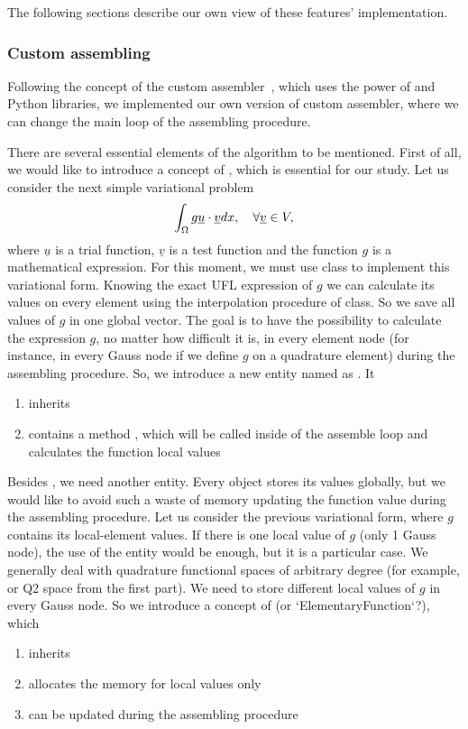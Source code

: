 \documentclass[12pt]{article}
\begin{document}
The following sections describe our own view of these features' implementation.

\subsubsection{Custom assembling}

Following the concept of the custom assembler~\parencite{test_custom_assembler}, which uses the power of  and  Python libraries, we implemented our own version of custom assembler, where we can change the main loop of the assembling procedure.

There are several essential elements of the algorithm to be mentioned. First of all, we would like to introduce a concept of , which is essential for our study. Let us consider the next simple variational problem 
$$ \int_\Omega g \underline{u} \cdot \underline{v} dx, \quad \forall \underline{v} \in V, $$
where $\underline{u}$ is a trial function, $\underline{v}$ is a test function and the function $g$ is a mathematical expression. For this moment, we must use  class to implement this variational form. Knowing the exact UFL expression of $g$ we can calculate its values on every element using the interpolation procedure of  class. So we save all values of $g$ in one global vector. The goal is to have the possibility to calculate the expression $g$, no matter how difficult it is, in every element node (for instance, in every Gauss node if we define $g$ on a quadrature element) during the assembling procedure. So, we introduce a new entity named as . It
\begin{enumerate}
    \item inherits 
    \item contains a method , which will be called inside of the assemble loop and calculates the function local values
\end{enumerate}

Besides , we need another entity. Every  object stores its values globally, but we would like to avoid such a waste of memory updating the function value during the assembling procedure. Let us consider the previous variational form, where $g$ contains its local-element values. If there is one local value of $g$ (only 1 Gauss node), the use of the  entity would be enough, but it is a particular case. We generally deal with quadrature functional spaces of arbitrary degree (for example,  or Q2 space from the first part). We need to store different local values of $g$ in every Gauss node. So we introduce a concept of  (or `ElementaryFunction`?), which 
\begin{enumerate}
    \item inherits 
    \item allocates the memory for local values only
    \item can be updated during the assembling procedure
\end{enumerate}
\end{document}
